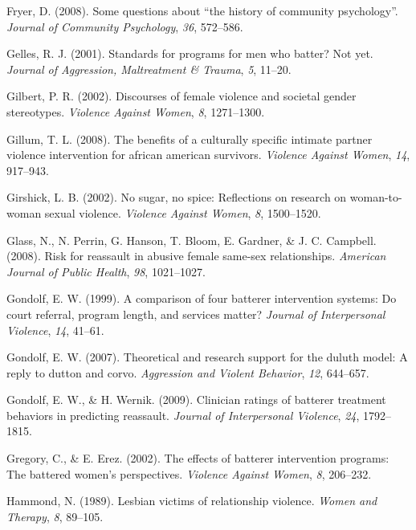 \documentclass[11pt,]{tufte-book}
\begin{document}
\hypertarget{ref-fryer2008some}{}
Fryer, D. (2008). Some questions about ``the history of community
psychology''. \emph{Journal of Community Psychology}, \emph{36},
572--586.

\hypertarget{ref-gelles2001standards}{}
Gelles, R. J. (2001). Standards for programs for men who batter? Not
yet. \emph{Journal of Aggression, Maltreatment \& Trauma}, \emph{5},
11--20.

\hypertarget{ref-gilbert2002discourses}{}
Gilbert, P. R. (2002). Discourses of female violence and societal gender
stereotypes. \emph{Violence Against Women}, \emph{8}, 1271--1300.

\hypertarget{ref-gillum2008benefits}{}
Gillum, T. L. (2008). The benefits of a culturally specific intimate
partner violence intervention for african american survivors.
\emph{Violence Against Women}, \emph{14}, 917--943.

\hypertarget{ref-girshick2002no}{}
Girshick, L. B. (2002). No sugar, no spice: Reflections on research on
woman-to-woman sexual violence. \emph{Violence Against Women}, \emph{8},
1500--1520.

\hypertarget{ref-glass2008risk}{}
Glass, N., N. Perrin, G. Hanson, T. Bloom, E. Gardner, \& J. C.
Campbell. (2008). Risk for reassault in abusive female same-sex
relationships. \emph{American Journal of Public Health}, \emph{98},
1021--1027.

\hypertarget{ref-gondolf1999comparison}{}
Gondolf, E. W. (1999). A comparison of four batterer intervention
systems: Do court referral, program length, and services matter?
\emph{Journal of Interpersonal Violence}, \emph{14}, 41--61.

\hypertarget{ref-gondolf2007theoretical}{}
Gondolf, E. W. (2007). Theoretical and research support for the duluth
model: A reply to dutton and corvo. \emph{Aggression and Violent
Behavior}, \emph{12}, 644--657.

\hypertarget{ref-gondolf2009clinician}{}
Gondolf, E. W., \& H. Wernik. (2009). Clinician ratings of batterer
treatment behaviors in predicting reassault. \emph{Journal of
Interpersonal Violence}, \emph{24}, 1792--1815.

\hypertarget{ref-gregory2002effects}{}
Gregory, C., \& E. Erez. (2002). The effects of batterer intervention
programs: The battered women's perspectives. \emph{Violence Against
Women}, \emph{8}, 206--232.

\hypertarget{ref-hammond1989lesbian}{}
Hammond, N. (1989). Lesbian victims of relationship violence.
\emph{Women and Therapy}, \emph{8}, 89--105.
\end{document}
